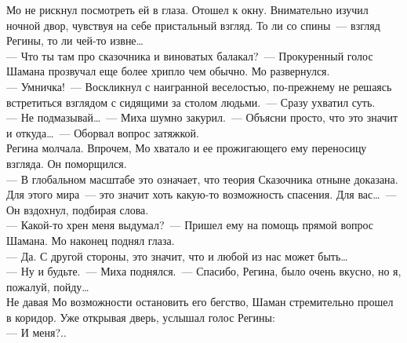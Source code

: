 Мо не рискнул посмотреть ей в глаза. Отошел к окну. Внимательно изучил ночной 
двор, чувствуя на себе пристальный взгляд. То ли со спины~--- взгляд Регины, то 
ли чей-то извне\ldots\\
--- Что ты там про сказочника и виноватых балакал?~--- Прокуренный голос Шамана 
прозвучал еще более хрипло чем обычно. Мо развернулся.\\
--- Умничка!~--- Воскликнул с наигранной веселостью, по-прежнему не решаясь 
встретиться взглядом с сидящими за столом людьми.~--- Сразу ухватил суть.\\
--- Не подмазывай\ldots~--- Миха шумно закурил.~--- Объясни просто, что это 
значит и откуда\ldots~--- Оборвал вопрос затяжкой.\\
Регина молчала. Впрочем, Мо хватало и ее прожигающего ему переносицу взгляда. 
Он поморщился.\\
--- В глобальном масштабе это означает, что теория Сказочника отныне доказана. 
Для этого мира~--- это значит хоть какую-то возможность спасения. Для вас\ldots~--- 
Он вздохнул, подбирая слова.\\
--- Какой-то хрен меня выдумал?~--- Пришел ему на помощь прямой вопрос Шамана. Мо 
наконец поднял глаза.\\
--- Да. С другой стороны, это значит, что и любой из нас может быть\ldots\\
--- Ну и будьте.~--- Миха поднялся.~--- Спасибо, Регина, было очень вкусно, но я, 
пожалуй, пойду\ldots\\
Не давая Мо возможности остановить его бегство, Шаман стремительно прошел в 
коридор. Уже открывая дверь, услышал голос Регины:\\
--- И меня?..\\
~\\

